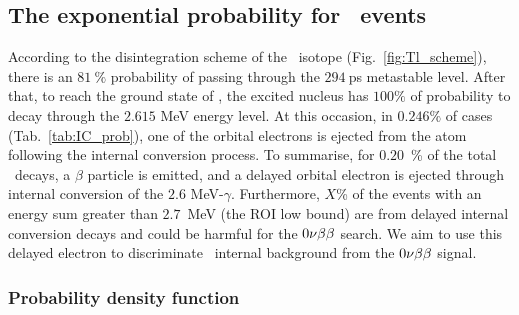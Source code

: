 \subsection{The exponential probability for \Tl\ events}

According to the disintegration scheme of the \Tl\ isotope (Fig.~\ref{fig:Tl_scheme}), there is an $81~\%$ probability of passing through the $294~$ps metastable level.
After that, to reach the ground state of \Pb, the excited nucleus has $100\%$ of probability to decay through the $2.615$ MeV energy level.
At this occasion, in $0.246\%$ of cases (Tab.~\ref{tab:IC_prob}), one of the orbital electrons is ejected from the atom following the internal conversion process.
To summarise, for $0.20$~\% of the total \Tl\ decays, a $\beta$ particle is emitted, and a delayed orbital electron is ejected through internal conversion of the $2.6$ MeV-$\gamma$.
Furthermore, $X$\% of the events with an energy sum greater than $2.7$~MeV (the ROI low bound) are from delayed internal conversion decays and could be harmful for the $0\nu\beta\beta$ search.
We aim to use this delayed electron to discriminate \Tl\ internal background from the $0\nu\beta\beta$ signal.


\subsubsection{Probability density function}

